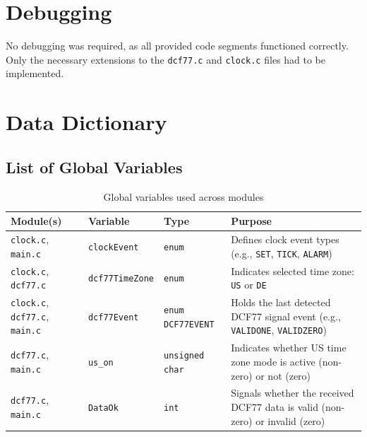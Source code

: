 \documentclass[a4paper,12pt]{article}
\begin{document}
\newpage


\section{Debugging}

No debugging was required, as all provided code segments functioned correctly.  
Only the necessary extensions to the \texttt{dcf77.c} and \texttt{clock.c} files had to be implemented.

\newpage


\section{Data Dictionary}


\subsection{List of Global Variables}

\begin{table}[H]
\centering
\renewcommand{\arraystretch}{1.3}
\begin{tabularx}{\textwidth}{|L{3.5cm}|L{2.8cm}|L{2.2cm}|X|}
\hline
\textbf{Module(s)} & \textbf{Variable} & \textbf{Type} & \textbf{Purpose} \\
\hline
\texttt{clock.c}, \texttt{main.c} & \texttt{clockEvent} & \texttt{enum} & Defines clock event types (e.g., \texttt{SET}, \texttt{TICK}, \texttt{ALARM}) \\
\hline
\texttt{clock.c}, \texttt{dcf77.c} & \texttt{dcf77TimeZone} & \texttt{enum} & Indicates selected time zone: \texttt{US} or \texttt{DE} \\
\hline
\texttt{clock.c}, \texttt{dcf77.c}, \texttt{main.c} & \texttt{dcf77Event} & \texttt{enum DCF77EVENT} & Holds the last detected DCF77 signal event (e.g., \texttt{VALIDONE}, \texttt{VALIDZERO}) \\
\hline
\texttt{dcf77.c}, \texttt{main.c} & \texttt{us\_on} & \texttt{unsigned char} & Indicates whether US time zone mode is active (non-zero) or not (zero) \\
\hline
\texttt{dcf77.c}, \texttt{main.c} & \texttt{DataOk} & \texttt{int} & Signals whether the received DCF77 data is valid (non-zero) or invalid (zero) \\
\hline
\end{tabularx}
\caption{Global variables used across modules}
\end{table}
\end{document}
